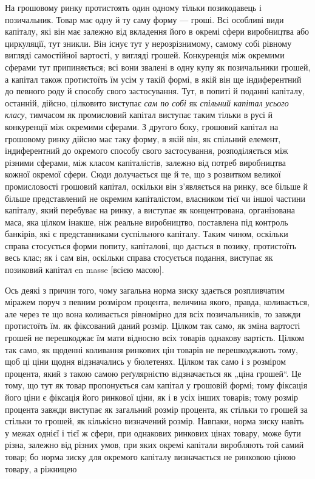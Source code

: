 
На грошовому ринку протистоять один одному тільки позикодавець
і позичальник. Товар має одну й ту саму форму —
гроші. Всі особливі види капіталу, які він має залежно від
вкладення його в окремі сфери виробництва або циркуляції,
тут зникли. Він існує тут у нерозрізнимому, самому собі рівному
вигляді самостійної вартості, у вигляді грошей. Конкуренція між
окремими сферами тут припиняється; всі вони звалені в одну купу
як позичальники грошей, а капітал також протистоїть їм усім
у такій формі, в якій він ще індиферентний до певного роду й способу
свого застосування. Тут, в попиті й поданні капіталу, останній,
дійсно, цілковито виступає \emph{сам по собі} як \emph{спільний капітал
усього класу}, тимчасом як промисловий капітал виступає
таким тільки в русі й конкуренції між окремими сферами.
З другого боку, грошовий капітал на грошовому ринку дійсно
має таку форму, в якій він, як спільний елемент, індиферентний до
окремого способу свого застосування, розподіляється між різними
сферами, між класом капіталістів, залежно від потреб
виробництва кожної окремої сфери. Сюди долучається ще й те,
що з розвитком великої промисловості грошовий капітал, оскільки
він з’являється на ринку, все більше й більше представлений не
окремим капіталістом, власником тієї чи іншої частини капіталу,
який перебуває на ринку, а виступає як концентрована,
організована маса, яка цілком інакше, ніж реальне виробництво,
поставлена під контроль банкірів, які є представниками суспільного
капіталу. Таким чином, оскільки справа стосується форми попиту,
капіталові, що дається в позику, протистоїть весь клас;
як і сам він, оскільки справа стосується подання, виступає як
позиковий капітал en masse [всією масою].

Ось деякі з причин того, чому загальна норма зиску здається
розпливчатим міражем поруч з певним розміром процента, величина
якого, правда, коливається, але через те що вона коливається
рівномірно для всіх позичальників, то завжди протистоїть
їм. як фіксований даний розмір. Цілком так само, як
зміна вартості грошей не перешкоджає їм мати відносно всіх
товарів однакову вартість. Цілком так само, як щоденні коливання
ринкових цін товарів не перешкоджають тому, щоб ці ціни
щодня відзначались у бюлетенях. Цілком так само і з розміром
процента, який з такою самою реґулярністю відзначається як
„ціна грошей“. Це тому, що тут як товар пропонується сам
капітал у грошовій формі; тому фіксація його ціни є фіксація
його ринкової ціни, як і в усіх інших товарів; тому розмір процента
завжди виступає як загальний розмір процента, як
стільки то грошей за стільки то грошей, як кількісно визначений
розмір. Навпаки, норма зиску навіть у межах однієї
і тієї ж сфери, при однакових ринкових цінах товару, може
бути різна, залежно від різних умов, при яких окремі капітали
виробляють той самий товар; бо норма зиску для окремого
капіталу визначається не ринковою ціною товару, а ріжницею
\parbreak{}  %
